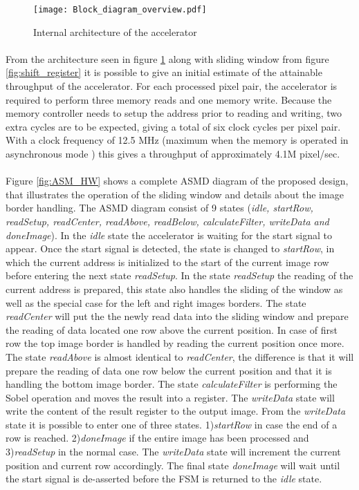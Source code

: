 \begin{figure}[H]
	\centering
	\texttt{[image: Block\_diagram\_overview.pdf]}
	\caption{Internal architecture of the accelerator}
	\label{fig:AccBlockDiagram}
\end{figure}

\paragraph*{}
From the architecture seen in figure \ref{fig:AccBlockDiagram} along with sliding window from figure \ref{fig:shift_register} it is possible to give an initial estimate of the attainable throughput of the accelerator. For each processed pixel pair, the accelerator is required to perform three memory reads and one memory write. Because the memory controller needs to setup the address prior to reading and writing, two extra cycles are to be expected, giving a total of six clock cycles per pixel pair.
With a clock frequency of 12.5 MHz (maximum when the memory is operated in asynchronous mode \cite{Micron:CellularRAM}) this gives a throughput of approximately 4.1M pixel/sec.

\paragraph*{}
Figure \ref{fig:ASM_HW} shows a complete ASMD diagram of the proposed design, that illustrates the operation of the sliding window and details about the image border handling. The ASMD diagram consist of 9 states (\emph{idle, startRow, readSetup, readCenter, readAbove, readBelow, calculateFilter, writeData and doneImage}).
In the \emph{idle} state the accelerator is waiting for the start signal to appear. Once the start signal is detected, the state is changed to \emph{startRow}, in which the current address is initialized to the start of the current image row before entering the next state \emph{readSetup}. In the state \emph{readSetup} the reading of the current address is prepared, this state also handles the sliding of the window as well as the special case for the left and right images borders. 
The state \emph{readCenter} will put the the newly read data into the sliding window and prepare the reading of data located one row above the current position. In case of first row the top image border is handled by reading the current position once more. The state \emph{readAbove} is almost identical to \emph{readCenter}, the difference is that it will prepare the reading of data one row below the current position and that it is handling the bottom image border.
The state \emph{calculateFilter} is performing the Sobel operation and moves the result into a register. The \emph{writeData} state will write the content of the result register to the output image. From the \emph{writeData} state it is possible to enter one of three states. 1)\emph{startRow} in case the end of a row is reached. 2)\emph{doneImage} if the entire image has been processed and 3)\emph{readSetup} in the normal case.
The \emph{writeData} state will increment the current position and current row accordingly. The final state \emph{doneImage} will wait until the start signal is de-asserted before the FSM is returned to the \emph{idle} state.

